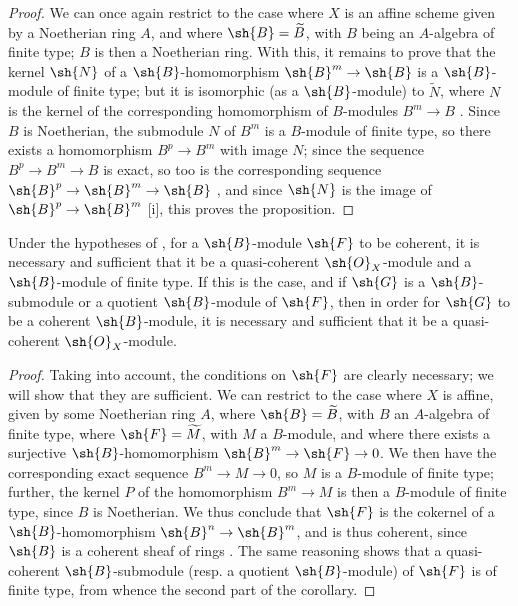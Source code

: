 \begin{proof}
We can once again restrict to the case where $X$ is an affine scheme given by a Noetherian ring $A$, and where $\sh{B}=\widetilde{B}$, with $B$ being an $A$-algebra of finite type; $B$ is then a Noetherian ring.
With this, it remains to prove that the kernel $\sh{N}$ of a $\sh{B}$-homomorphism $\sh{B}^m\to\sh{B}$ is a $\sh{B}$-
module of finite type; but it is isomorphic (as a $\sh{B}$-module) to $\widetilde{N}$, where $N$ is the kernel of the corresponding homomorphism of $B$-modules $B^m\to B$ .
Since $B$ is Noetherian, the submodule $N$ of $B^m$ is a $B$-module of finite type, so there exists a homomorphism $B^p\to B^m$ with image $N$; since the sequence $B^p\to B^m\to B$ is exact, so too is the corresponding sequence $\sh{B}^p\to\sh{B}^m\to\sh{B}$ , and since $\sh{N}$ is the image of $\sh{B}^p\to\sh{B}^m$ [i], this proves the proposition.
\end{proof}

\begin{corollary}[9.6.4]
\label{I.9.6.4}
Under the hypotheses of , for a $\sh{B}$-module $\sh{F}$ to be coherent, it is necessary and sufficient that it be a quasi-coherent $\sh{O}_X$-module and a $\sh{B}$-module of finite type.
If this is the case, and if $\sh{G}$ is a $\sh{B}$-submodule or a quotient $\sh{B}$-module of $\sh{F}$, then in order for $\sh{G}$ to be a coherent $\sh{B}$-module, it is necessary and sufficient that it be a quasi-coherent $\sh{O}_X$-module.
\end{corollary}

\begin{proof}
Taking  into account, the conditions on $\sh{F}$ are clearly necessary; we will show that they are sufficient.
We can restrict to the case where $X$ is affine, given by some Noetherian ring $A$, where $\sh{B}=\widetilde{B}$, with $B$ an $A$-algebra of finite type, where $\sh{F}=\widetilde{M}$, with $M$ a $B$-module, and where there exists a surjective $\sh{B}$-homomorphism $\sh{B}^m\to\sh{F}\to0$.
We then have the corresponding exact sequence $B^m\to M\to0$, so $M$ is a $B$-module of finite type; further, the kernel $P$ of the homomorphism $B^m\to M$ is then a $B$-module of finite type, since $B$ is Noetherian.
We thus conclude  that $\sh{F}$ is the cokernel of a $\sh{B}$-homomorphism $\sh{B}^n\to\sh{B}^m$, and is thus coherent, since $\sh{B}$ is a coherent sheaf of rings .
The same reasoning shows that a quasi-coherent $\sh{B}$-submodule (resp. a quotient $\sh{B}$-module) of $\sh{F}$ is of finite type, from whence the second part of the corollary.
\end{proof}

